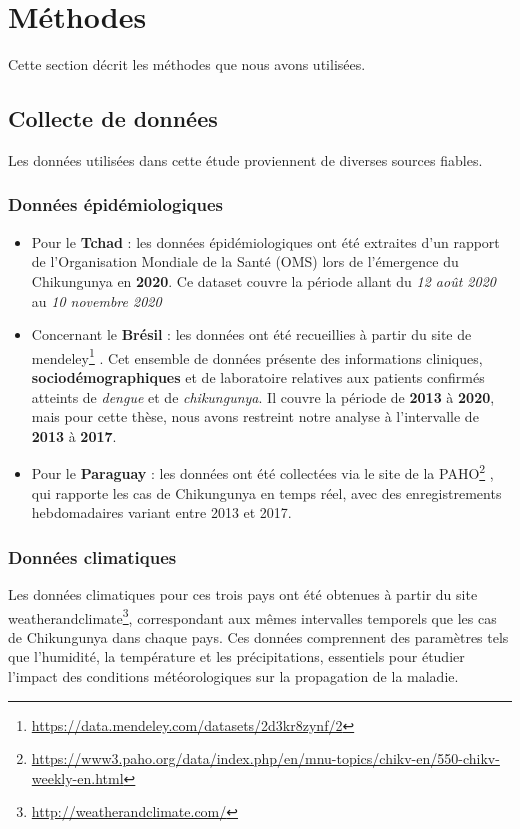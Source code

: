 
\section{Méthodes}
Cette section décrit les méthodes que nous avons utilisées.

\subsection{Collecte de données}
Les données utilisées dans cette étude proviennent de diverses sources fiables. 
\subsubsection{Données épidémiologiques}
\begin{itemize}
	\item Pour le \textbf{Tchad} : les données épidémiologiques ont été extraites d'un rapport~\cite{rapport2020oms} de l'Organisation Mondiale de la Santé (OMS) lors de l'émergence du Chikungunya en \textbf{2020}. Ce dataset couvre la période allant du \textit{12 août 2020} au \textit{10 novembre 2020}
	\item Concernant le \textbf{Brésil} : les données ont été recueillies à partir du site de mendeley\footnote{\url{https://data.mendeley.com/datasets/2d3kr8zynf/2}} . Cet ensemble de données présente des informations cliniques, \textbf{sociodémographiques} et de laboratoire relatives aux patients confirmés atteints de \textit{dengue} et de \textit{chikungunya}. Il couvre la période de \textbf{2013} à \textbf{2020}, mais pour cette thèse, nous avons restreint notre analyse à l'intervalle de \textbf{2013} à \textbf{2017}.
	\item Pour le \textbf{Paraguay} : les données ont été collectées via le site de la PAHO\footnote{\url{https://www3.paho.org/data/index.php/en/mnu-topics/chikv-en/550-chikv-weekly-en.html}} , qui rapporte les cas de Chikungunya en temps réel, avec des enregistrements hebdomadaires variant entre 2013 et 2017.
\end{itemize}
\subsubsection{Données climatiques}
Les données climatiques pour ces trois pays ont été obtenues à partir du site weatherandclimate\footnote{\url{http://weatherandclimate.com/}}, correspondant aux mêmes intervalles temporels que les cas de Chikungunya dans chaque pays. Ces données comprennent des paramètres tels que l'humidité, la température et les précipitations, essentiels pour étudier l'impact des conditions météorologiques sur la propagation de la maladie.

